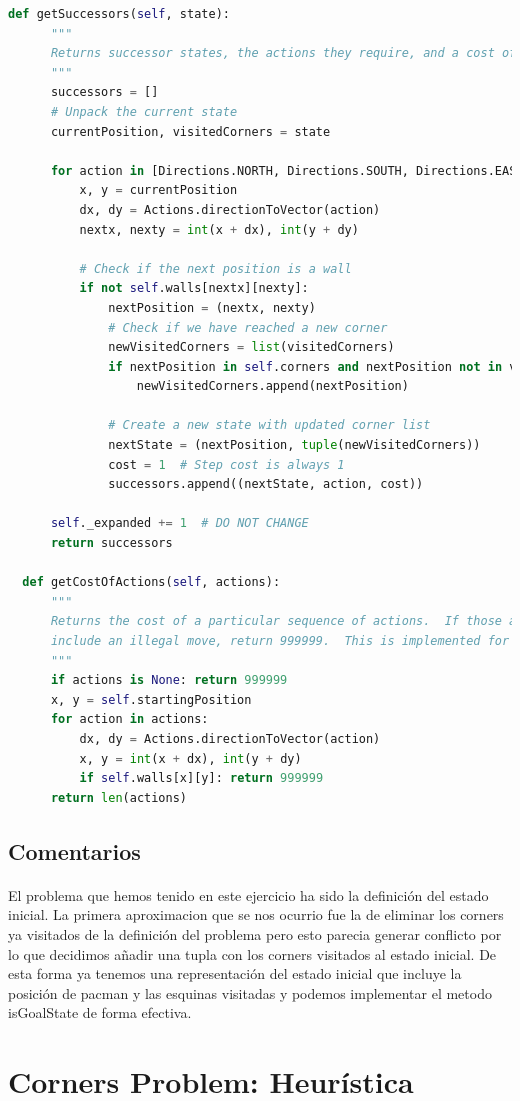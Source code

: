 \documentclass{report}
\begin{document}
\begin{lstlisting}[language=Python, caption=Implementación final del problema de las esquinas]
  def getSuccessors(self, state):
      """
      Returns successor states, the actions they require, and a cost of 1.
      """
      successors = []
      # Unpack the current state
      currentPosition, visitedCorners = state

      for action in [Directions.NORTH, Directions.SOUTH, Directions.EAST, Directions.WEST]:
          x, y = currentPosition
          dx, dy = Actions.directionToVector(action)
          nextx, nexty = int(x + dx), int(y + dy)

          # Check if the next position is a wall
          if not self.walls[nextx][nexty]:
              nextPosition = (nextx, nexty)
              # Check if we have reached a new corner
              newVisitedCorners = list(visitedCorners)
              if nextPosition in self.corners and nextPosition not in visitedCorners:
                  newVisitedCorners.append(nextPosition)

              # Create a new state with updated corner list
              nextState = (nextPosition, tuple(newVisitedCorners))
              cost = 1  # Step cost is always 1
              successors.append((nextState, action, cost))

      self._expanded += 1  # DO NOT CHANGE
      return successors

  def getCostOfActions(self, actions):
      """
      Returns the cost of a particular sequence of actions.  If those actions
      include an illegal move, return 999999.  This is implemented for you.
      """
      if actions is None: return 999999
      x, y = self.startingPosition
      for action in actions:
          dx, dy = Actions.directionToVector(action)
          x, y = int(x + dx), int(y + dy)
          if self.walls[x][y]: return 999999
      return len(actions)        
          \end{lstlisting}
        \subsection*{Comentarios}
          \paragraph*{}{
            El problema que hemos tenido en este ejercicio ha sido la definición del estado inicial. La primera aproximacion que se nos ocurrio fue la de eliminar los corners ya visitados de la definición del problema pero esto parecia generar conflicto por lo que decidimos añadir una tupla con los corners visitados al estado inicial.
            De esta forma ya tenemos una representación del estado inicial que incluye la posición de pacman y las esquinas visitadas y podemos implementar el metodo isGoalState de forma efectiva.
          }
      \clearpage\section{Corners Problem: Heurística}
\end{document}
